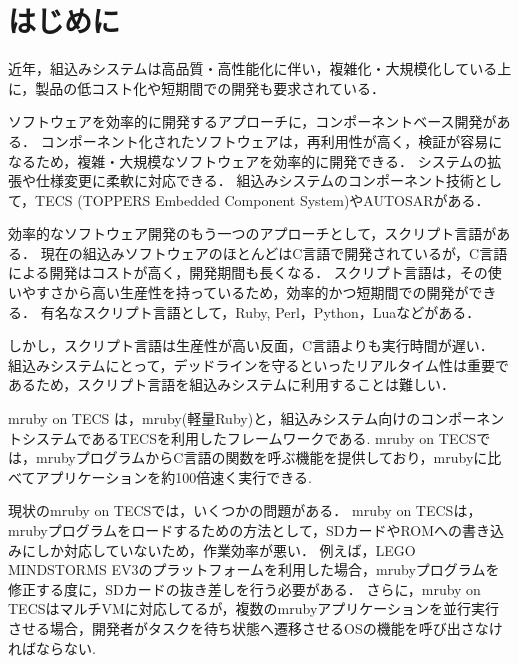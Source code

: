 \documentclass[submit,techrep]{ipsj}
\begin{document}

\maketitle

\section{はじめに}
\vspace{-2mm}
近年，組込みシステムは高品質・高性能化に伴い，複雑化・大規模化している上に，製品の低コスト化や短期間での開発も要求されている．

ソフトウェアを効率的に開発するアプローチに，コンポーネントベース開発がある．
コンポーネント化されたソフトウェアは，再利用性が高く，検証が容易になるため，複雑・大規模なソフトウェアを効率的に開発できる．
システムの拡張や仕様変更に柔軟に対応できる．
組込みシステムのコンポーネント技術として，TECS (TOPPERS Embedded Component System)\cite{par:TECS}やAUTOSAR\cite{url:AUTOSAR}がある．

効率的なソフトウェア開発のもう一つのアプローチとして，スクリプト言語がある．
現在の組込みソフトウェアのほとんどはC言語で開発されているが，C言語による開発はコストが高く，開発期間も長くなる．
スクリプト言語は，その使いやすさから高い生産性を持っているため，効率的かつ短期間での開発ができる．
有名なスクリプト言語として，Ruby, Perl，Python，Luaなどがある．

しかし，スクリプト言語は生産性が高い反面，C言語よりも実行時間が遅い．
組込みシステムにとって，デッドラインを守るといったリアルタイム性は重要であるため，スクリプト言語を組込みシステムに利用することは難しい．

mruby on TECS \cite{par:mrubyonTECS}は，mruby(軽量Ruby)\cite{par:mruby}と，組込みシステム向けのコンポーネントシステムであるTECSを利用したフレームワークである.
mruby on TECSでは，mrubyプログラムからC言語の関数を呼ぶ機能を提供しており，mrubyに比べてアプリケーションを約100倍速く実行できる.

現状のmruby on TECSでは，いくつかの問題がある．
mruby on TECSは，mrubyプログラムをロードするための方法として，SDカードやROMへの書き込みにしか対応していないため，作業効率が悪い．
例えば，LEGO MINDSTORMS EV3のプラットフォーム\cite{par:EV3}を利用した場合，mrubyプログラムを修正する度に，SDカードの抜き差しを行う必要がある．
さらに，mruby on TECSはマルチVMに対応してるが，複数のmrubyアプリケーションを並行実行させる場合，開発者がタスクを待ち状態へ遷移させるOSの機能を呼び出さなければならない.
\end{document}
